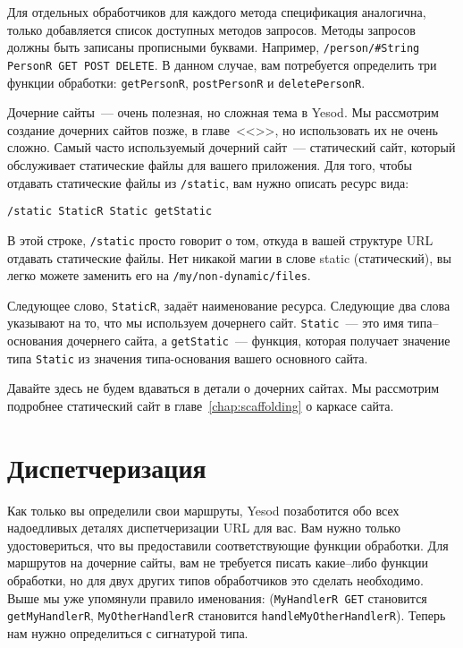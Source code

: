 Для отдельных обработчиков для каждого метода спецификация аналогична,
только добавляется список доступных методов запросов. Методы запросов
должны быть записаны прописными буквами. Например,
\lstinline!/person/#String PersonR GET POST DELETE!.
В данном случае, вам потребуется определить три функции обработки:
\lstinline!getPersonR!, \lstinline!postPersonR! и \lstinline!deletePersonR!.

Дочерние сайты~--- очень полезная, но сложная тема в Yesod. Мы рассмотрим
создание дочерних сайтов позже, в главе~<<>>,
но использовать их не очень сложно. Самый
часто используемый дочерний сайт~--- статический сайт, который
обслуживает статические файлы для вашего приложения. Для того, чтобы
отдавать статические файлы из \lstinline!/static!, вам нужно описать
ресурс вида:
\begin{verbatim}
/static StaticR Static getStatic
\end{verbatim}

В этой строке, \lstinline!/static! просто говорит о том, откуда в вашей
структуре URL отдавать статические файлы. Нет никакой магии в слове
static (статический), вы легко можете заменить его на
\lstinline!/my/non-dynamic/files!.

Следующее слово, \lstinline!StaticR!, задаёт наименование
ресурса. Следующие два слова указывают на то, что мы используем
дочернего сайт. \lstinline!Static!~--- это имя типа--основания дочернего сайта, а
\lstinline!getStatic!~--- функция, которая получает значение типа
\lstinline!Static! из значения типа-основания вашего основного сайта.

Давайте здесь не будем вдаваться в детали о дочерних сайтах. Мы рассмотрим
подробнее статический сайт в главе~\ref{chap:scaffolding} о каркасе сайта.

\section{Диспетчеризация}
Как только вы определили свои маршруты, Yesod позаботится обо всех
надоедливых деталях диспетчеризации URL для вас. Вам нужно только
удостовериться, что вы предоставили соответствующие функции
обработки. Для маршрутов на дочерние сайты, вам не требуется писать
какие--либо функции обработки, но для двух других типов обработчиков
это сделать необходимо. Выше мы уже упомянули правило именования:
(\lstinline!MyHandlerR GET! становится \lstinline!getMyHandlerR!,
\lstinline!MyOtherHandlerR! становится \lstinline!handleMyOtherHandlerR!).
Теперь нам нужно определиться с сигнатурой типа.

